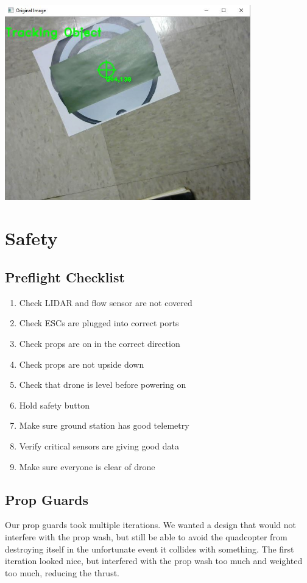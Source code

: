 \documentclass[12pt]{article}
\begin{document}
\begin{center}
\includegraphics[width=0.8\textwidth]{tracking}
\end{center}

\section{Safety}
\subsection{Preflight Checklist}
\begin{enumerate}
	\item Check LIDAR and flow sensor are not covered 
	\item Check ESCs are plugged into correct ports 
	\item Check props are on in the correct direction 
	\item Check props are not upside down
	\item Check that drone is level before powering on
	\item Hold safety button
	\item Make sure ground station has good telemetry
	\item Verify critical sensors are giving good data
	\item Make sure everyone is clear of drone 
\end{enumerate}


\subsection{Prop Guards}
Our prop guards took multiple iterations. We wanted a design that would not interfere with the prop wash, but still be able to avoid the quadcopter from destroying itself in the unfortunate event it collides with something. The first iteration looked nice, but interfered with the prop wash too much and weighted too much, reducing the thrust. 
\end{document}
